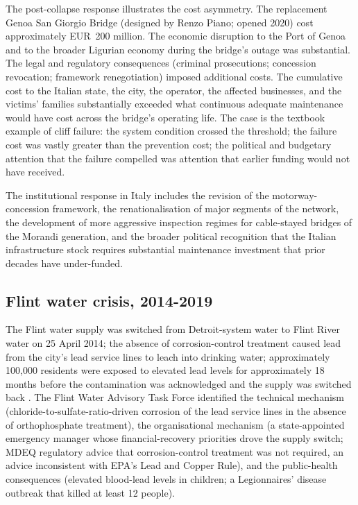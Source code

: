 The post-collapse response illustrates the cost asymmetry. The replacement Genoa San Giorgio Bridge (designed by Renzo Piano; opened 2020) cost approximately EUR~200 million. The economic disruption to the Port of Genoa and to the broader Ligurian economy during the bridge's outage was substantial. The legal and regulatory consequences (criminal prosecutions; concession revocation; framework renegotiation) imposed additional costs. The cumulative cost to the Italian state, the city, the operator, the affected businesses, and the victims' families substantially exceeded what continuous adequate maintenance would have cost across the bridge's operating life. The case is the textbook example of cliff failure: the system condition crossed the threshold; the failure cost was vastly greater than the prevention cost; the political and budgetary attention that the failure compelled was attention that earlier funding would not have received.

The institutional response in Italy includes the revision of the motorway-concession framework, the renationalisation of major segments of the network, the development of more aggressive inspection regimes for cable-stayed bridges of the Morandi generation, and the broader political recognition that the Italian infrastructure stock requires substantial maintenance investment that prior decades have under-funded.

\subsection*{Flint water crisis, 2014-2019}

The Flint water supply was switched from Detroit-system water to Flint River water on 25 April 2014; the absence of corrosion-control treatment caused lead from the city's lead service lines to leach into drinking water; approximately 100,000 residents were exposed to elevated lead levels for approximately 18 months before the contamination was acknowledged and the supply was switched back \cite{acc:fwatf-2016}. The Flint Water Advisory Task Force identified the technical mechanism (chloride-to-sulfate-ratio-driven corrosion of the lead service lines in the absence of orthophosphate treatment), the organisational mechanism (a state-appointed emergency manager whose financial-recovery priorities drove the supply switch; MDEQ regulatory advice that corrosion-control treatment was not required, an advice inconsistent with EPA's Lead and Copper Rule), and the public-health consequences (elevated blood-lead levels in children; a Legionnaires' disease outbreak that killed at least 12 people).


